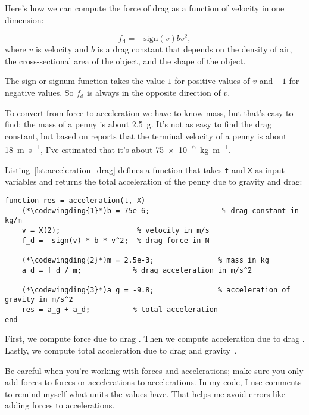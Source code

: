 Here's how we can compute the force of drag as a function of velocity in one dimension:

\begin{equation*}
    f_\mathrm{d} = -\mathrm{sign}(v) b v^2 ,
\end{equation*}
where $v$ is velocity and
$b$ is a drag constant that depends on the density of
air, the cross-sectional area of the object, and the shape
of the object.  

The sign or signum function takes the value $1$ for positive values of 
$v$ and $-1$ for negative values.  So $f_\mathrm{d}$ is always in the opposite direction of $v$.


To convert from force to acceleration we have to know mass, but that's easy to find: the mass of a penny is about \SI{2.5}{\gram}.  It's not as easy to find the drag constant, but based on reports that the terminal velocity of a penny is about \SI{18}{\meter \per \second}, I've estimated that it's about \SI{75e-6}{\kilogram \per \meter}.

Listing~\ref{lst:acceleration_drag} defines a function that takes \lstinline{t} and \lstinline{X} as input variables and returns the total acceleration of the penny due to gravity and drag:

\begin{lstlisting}[caption={Calculating acceleration of a penny with drag}, label={lst:acceleration_drag}]
function res = acceleration(t, X)
    (*\codewingding{1}*)b = 75e-6;                 % drag constant in kg/m
    v = X(2);                  % velocity in m/s
    f_d = -sign(v) * b * v^2;  % drag force in N

    (*\codewingding{2}*)m = 2.5e-3;               % mass in kg
    a_d = f_d / m;            % drag acceleration in m/s^2

    (*\codewingding{3}*)a_g = -9.8;               % acceleration of gravity in m/s^2
    res = a_g + a_d;          % total acceleration
end
\end{lstlisting}

First, we compute force due to drag .
Then we compute acceleration due to drag .
Lastly, we compute total acceleration due to drag and gravity~.


Be careful when you're working with forces and accelerations; make sure
you only add forces to forces or accelerations to accelerations.  In my
code, I use comments to remind myself what units the values have.
That helps me avoid errors like adding forces to accelerations.

